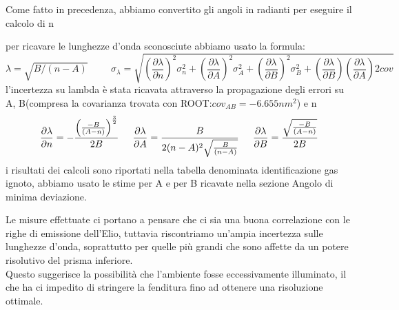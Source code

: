\documentclass[a4paper]{article}
\theoremstyle{definition}
\begin{document}
Come fatto in precedenza, abbiamo convertito gli angoli in radianti per eseguire il calcolo di n


\begin{figure}[!htbp]
    	\captionsetup{labelformat=empty}
    \end{figure}
per ricavare le lunghezze d'onda sconosciute abbiamo usato la formula:
\[\lambda = \sqrt{ B/(n-A) } \hspace{1cm} \sigma_{\lambda}= \sqrt{ (\frac{\partial \lambda}{\partial n})^{2}\sigma_{n}^{2} + (\frac{\partial \lambda}{\partial A})^{2}\sigma_{A}^{2}  + (\frac{\partial \lambda}{\partial B})^{2}\sigma_{B}^{2} + (\frac{\partial \lambda}{\partial B})(\frac{\partial \lambda}{\partial A})2cov}\]
l'incertezza su lambda è stata ricavata attraverso la propagazione degli errori su A, B(compresa la covarianza trovata con ROOT:\(cov_{AB} = -6.655nm^{2}\)) e n
\[
        \frac{\partial \lambda}{\partial n}= -\frac{ \left( \frac{-B}{(A-n)}\right)^{\frac{3}{2}}}{2B} \hspace{0.5 cm} \frac{\partial \lambda}{\partial A}= \frac{B}{ 2(n-A)^{2}\sqrt{\frac{B}{( n-A ) }}} \hspace{0.5 cm} \frac{\partial \lambda}{\partial B}= \frac{\sqrt{\frac{-B}{(A-n)}}}{ 2B}
\]
i risultati dei calcoli sono riportati nella tabella denominata identificazione gas ignoto, abbiamo usato le stime per A e per B ricavate nella sezione Angolo di minima deviazione.\\

\pagebreak

\noindent Le misure effettuate ci portano a pensare che ci sia una buona correlazione con le righe di emissione dell'Elio, tuttavia riscontriamo un'ampia incertezza sulle lunghezze d'onda, soprattutto per quelle più grandi che sono affette da un potere risolutivo del prisma inferiore.\\
Questo suggerisce la possibilità che l'ambiente fosse eccessivamente illuminato, il che ha ci impedito di stringere la fenditura fino ad ottenere una risoluzione ottimale.
 
\end{document}
